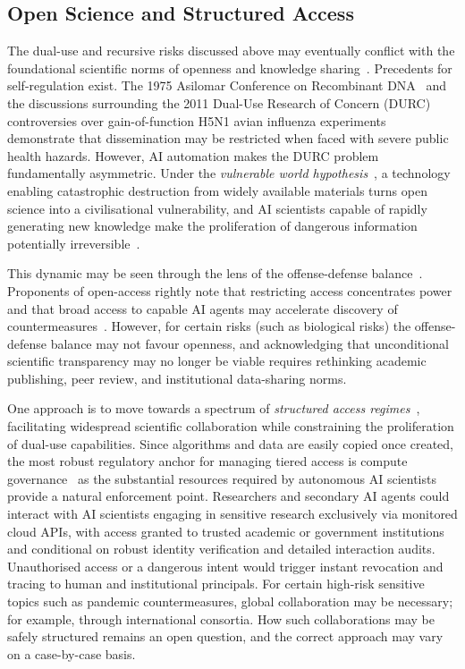 \documentclass[11pt, a4paper, twocolumn, goog]{google}
\begin{document}
\subsection{Open Science and Structured Access}

The dual-use and recursive risks discussed above may eventually conflict with the foundational scientific norms of openness and knowledge sharing~\citep{nosek2015promoting, nosek2012scientific}. Precedents for self-regulation exist. The 1975 Asilomar Conference on Recombinant DNA~\citep{berg1975summary} and the discussions surrounding the 2011 Dual-Use Research of Concern (DURC) controversies over gain-of-function H5N1 avian influenza experiments~\citep{fouchier2013transmission, duprex2015gain} demonstrate that dissemination may be restricted when faced with severe public health hazards. However, AI automation makes the DURC problem fundamentally asymmetric. Under the \emph{vulnerable world hypothesis}~\citep{bostrom2019vulnerable}, a technology enabling catastrophic destruction from widely available materials turns open science into a civilisational vulnerability, and AI scientists capable of rapidly generating new knowledge make the proliferation of dangerous information potentially irreversible~\citep{seger2023open}.

This dynamic may be seen through the lens of the offense-defense balance~\citep{garfinkel2021does}. Proponents of open-access rightly note that restricting access concentrates power and that broad access to capable AI agents may accelerate discovery of countermeasures~\citep{kapoor2024societal}. However, for certain risks (such as biological risks) the offense-defense balance may not favour openness, and acknowledging that unconditional scientific transparency may no longer be viable requires rethinking academic publishing, peer review, and institutional data-sharing norms.

One approach is to move towards a spectrum of \emph{structured access regimes}~\citep{shevlane2022structured}, facilitating widespread scientific collaboration while constraining the proliferation of dual-use capabilities. Since algorithms and data are easily copied once created, the most robust regulatory anchor for managing tiered access is compute governance~\citep{anderljung2023frontier, sastry2024computing} as the substantial resources required by autonomous AI scientists provide a natural enforcement point. Researchers and secondary AI agents could interact with AI scientists engaging in sensitive research exclusively via monitored cloud APIs, with access granted to trusted academic or government institutions and conditional on robust identity verification and detailed interaction audits. Unauthorised access or a dangerous intent would trigger instant revocation and tracing to human and institutional principals. For certain high-risk sensitive topics such as pandemic countermeasures, global collaboration may be necessary; for example, through international consortia. How such collaborations may be safely structured remains an open question, and the correct approach may vary on a case-by-case basis.
\end{document}
